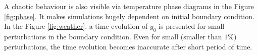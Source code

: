 \documentclass{llncs}
\begin{document}
A chaotic behaviour is also visible via temperature phase diagrams in the Figure \ref{fig:phase}. It makes simulations hugely dependent on initial boundary condition. In the Figure
\ref{fig:weather}. a time evolution of $y_0$ is presented for small perturbations in the boundary condition. Even for small (smaller than $1\%$) perturbations, the time evolution
becomes inaccurate after short period of time.

\begin{figure}
  \centering
  \begin{minipage}{.49\linewidth}
    \centering
  \end{minipage}
  \begin{minipage}{.49\linewidth}
    \centering

\end{minipage}
\end{figure}
\end{document}
